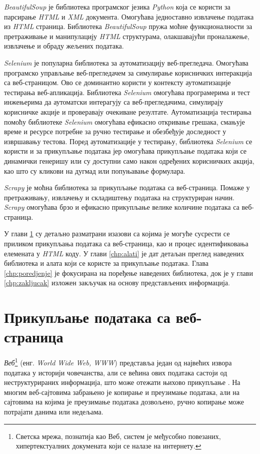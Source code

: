 \documentclass[12pt,oneside]{memoir}
\begin{document}
\textit{BeautifulSoup} је библиотека програмског језика \textit{Python} \cite{pythonDocs} која се користи за парсирање \textit{HTML} и \textit{XML} документа. Омогућава једноставно извлачење података из \textit{HTML} страница. Библиотека \textit{BeautifulSoup} пружа моћне функционалности за претраживање и манипулацију \textit{HTML} структурама, олакшавајући проналажење, извлачење и обраду жељених података.

\textit{Selenium} је популарна библиотека за аутоматизацију веб-прегледача. Омогућава програмско управљање веб-прегледачем за симулирање корисничких
интеракција са веб-страницом. Ово се доминантно користи у контексту аутоматизације тестирања веб-апликација. Библиотека \textit{Selenium} омогућава програмерима и тест инжењерима да аутоматски интерагују са веб-прегледачима, симулирају корисничке акције и проверавају очекиване резултате. Аутоматизација тестирања помоћу библиотеке \textit{Selenium} омогућава ефикасно откривање грешака, смањује време и ресурсе потребне за ручно тестирање и обезбеђује доследност у извршавању тестова. Поред аутоматизације у тестирању, библиотека \textit{Selenium} се користи и за прикупљање података јер омогућава прикупљање података који се динамички генеришу или су доступни само након одређених корисничких акција, као што су кликови на дугмад или попуњавање формулара.

\textit{Scrapy} је моћна библиотека за прикупљање података са веб-страница. Помаже у претраживању, извлачењу и складиштењу података на структуриран начин. \textit{Scrapy} омогућава брзо и ефикасно прикупљање велике количине података са веб-страница. 

У глави \ref{chp:prikupljanje} су детаљно разматрани изазови са којима је могуће сусрести се приликом прикупљања података са веб-страница, као и процес идентификовања елемената у \textit{HTML} коду. У глави \ref{chp:alati} је дат детаљан преглед наведених библиотека и алата који се користе за прикупљање података. Глава \ref{chp:poredjenje} је фокусирана на поређење наведених библиотека, док је у глави \ref{chp:zakljucak} изложен закључак на основу представљених информација.

\chapter{Прикупљање података са веб-страница}
\label{chp:prikupljanje}
\emph{Веб}\footnote{Светска мрежа, познатија као Веб, систем је међусобно повезаних, хипертекстуалних докумената који се налазе на интернету.} (енг. \textit{World Wide Web, WWW}) представља један од највећих извора података у историји човечанства, али се већина ових података састоји од неструктурираних информација, што може отежати њихово прикупљање \cite{osmarPaper}. 
На многим веб-сајтовима забрањено је копирање и преузимање података, али на сајтовима на којима је преузимање података дозвољено, ручно копирање може потрајати данима или недељама.
\end{document}

